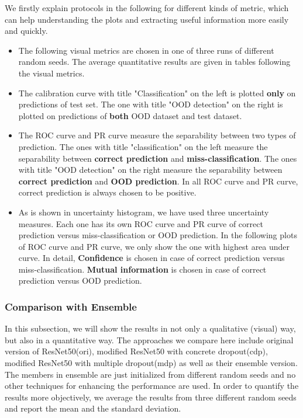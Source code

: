 We firstly explain protocols in the following for different kinds of metric, which can help understanding the plots and extracting useful information more easily and quickly.  
\begin{itemize}
	\item The following visual metrics are chosen in one of three runs of different random seeds. The average quantitative results are given in tables following the visual metrics.
	\item The calibration curve with title "Classification" on the left is plotted \textbf{only} on predictions of test set. The one with title "OOD detection" on the right is plotted on predictions of \textbf{both} OOD dataset and test dataset.
	\item The ROC curve and PR curve measure the separability between two types of prediction.
	The ones with title "classification" on the left measure the separability between \textbf{correct prediction} and \textbf{miss-classification}. The ones with title "OOD detection" on the right measure the separability between \textbf{correct prediction} and \textbf{OOD prediction}. In all ROC curve and PR curve, correct prediction is always chosen to be positive.
	\item As is shown in uncertainty histogram, we have used three uncertainty measures. Each one has its own ROC curve and PR curve of correct prediction versus miss-classification or OOD prediction. In the following plots of ROC curve and PR curve, we only show the one with highest area under curve. In detail, \textbf{Confidence} is chosen in case of correct prediction versus miss-classification. \textbf{Mutual information} is chosen in case of correct prediction versus OOD prediction.
\end{itemize}   

\subsubsection{Comparison with Ensemble}
In this subsection, we will show the results in not only a qualitative (visual) way, but also in a quantitative way. The approaches we compare here include original version of ResNet50(ori), modified ResNet50 with concrete dropout(cdp), modified ResNet50 with multiple dropout(mdp) as well as their ensemble version. The members in ensemble are just initialized from different random seeds and no other techniques for enhancing the performance are used. In order to quantify the results more objectively, we average the results from three different random seeds and report the mean and the standard deviation.

